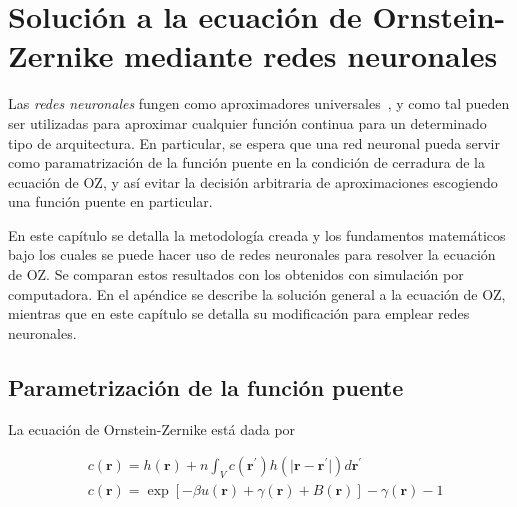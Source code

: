 \newcommand{\vecr}{\mathbf{r}}
\newcommand{\veck}{\mathbf{k}}
\newcommand{\nnet}{N_{\theta}(\mathbf{r})}
\chapter{Solución a la ecuación de Ornstein-Zernike mediante redes neuronales} %

\label{Cap3} %


Las \emph{redes neuronales} fungen como aproximadores universales~\cite{hornikMultilayerFeedforwardNetworks1989, hornikApproximationCapabilitiesMultilayer1991, cybenkoApproximationSuperpositionsSigmoidal1989},
y como tal pueden ser utilizadas para aproximar cualquier función continua para un determinado tipo de arquitectura.
En particular, se espera que una red neuronal pueda servir como paramatrización de la
función puente en la condición de cerradura de la ecuación de OZ, y así evitar la decisión
arbitraria de aproximaciones escogiendo una función puente en particular.

En este capítulo se detalla la metodología creada y los fundamentos matemáticos bajo los
cuales se puede hacer uso de redes neuronales para resolver la ecuación de OZ.
Se comparan estos resultados con los obtenidos con simulación por computadora.
En el apéndice se describe la solución general a la ecuación de OZ, mientras que
en este capítulo se detalla su modificación para emplear redes neuronales.

\section{Parametrización de la función puente}

La ecuación de Ornstein-Zernike está dada por

\begin{subequations}
    \begin{align*}
         & c(\vecr) = h(\vecr) +
        n \int_{V}
        c(\vecr^{\prime})
        h(\lvert \vecr - \vecr^{\prime} \rvert)
        d\vecr^{\prime} \label{eq:oz1} \\
         & c(\vecr)
        = \exp{\left[
                -  \beta u(\vecr)
                +  \gamma(\vecr)
                + B(\vecr)
                \right]} -
        \gamma(\vecr)
        - 1
    \end{align*}
\end{subequations}

